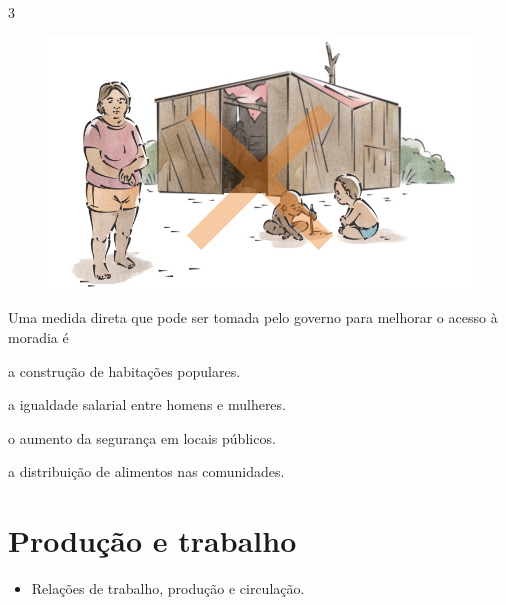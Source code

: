 \num{3}

\begin{figure}[htpb!]
\includegraphics[width=.5\textwidth]{./imgs/img52.jpg}
\end{figure}

\noindent{}Uma medida direta que pode ser tomada pelo governo para melhorar o
acesso à moradia é

\begin{escolha}
\item a construção de habitações populares.

\item a igualdade salarial entre homens e mulheres.

\item o aumento da segurança em locais públicos.

\item a distribuição de alimentos nas comunidades.
\end{escolha}


\chapter{Produção e trabalho}



\begin{itemize}
\item Relações de trabalho, produção e circulação.
\end{itemize}


